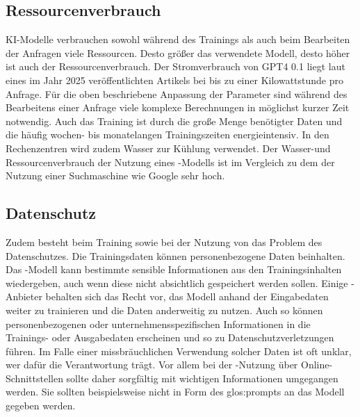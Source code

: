 \documentclass[../main.tex]{subfiles}
\begin{document}
\subsection{Ressourcenverbrauch}

KI-Modelle verbrauchen sowohl während des Trainings als auch beim Bearbeiten der Anfragen viele Ressourcen. Desto größer das verwendete Modell, desto höher ist auch der Ressourcenverbrauch. 
Der Stromverbrauch von GPT4 0.1 liegt laut eines im Jahr 2025 veröffentlichten Artikels bei bis zu einer Kilowattstunde pro Anfrage\cite{Energieverbrauch}. Für die oben beschriebene Anpassung der Parameter sind während des Bearbeitens einer Anfrage viele 
komplexe Berechnungen in möglichst kurzer Zeit notwendig. Auch das Training ist durch die große Menge benötigter Daten und die häufig wochen- bis monatelangen Trainingszeiten 
energieintensiv. In den Rechenzentren wird zudem Wasser zur Kühlung verwendet. Der Wasser-und Ressourcenverbrauch der Nutzung eines -Modells ist im Vergleich zu dem der Nutzung einer 
Suchmaschine wie Google sehr hoch\cite{KINachhaltigkeit}. 

\subsection{Datenschutz}
\label{sec:datenschutz}

Zudem besteht beim Training sowie bei der Nutzung von  das Problem des Datenschutzes. Die Trainingsdaten können personenbezogene Daten beinhalten. Das -Modell kann bestimmte sensible 
Informationen aus den Trainingsinhalten wiedergeben, auch wenn diese nicht absichtlich gespeichert werden sollen. Einige -Anbieter behalten sich das Recht vor, das Modell anhand der 
Eingabedaten weiter zu trainieren und die Daten anderweitig zu nutzen. Auch so können personenbezogenen oder unternehmensspezifischen Informationen in die Trainings- oder Ausgabedaten 
erscheinen und so zu Datenschutzverletzungen führen. Im Falle einer missbräuchlichen Verwendung solcher Daten ist oft unklar, wer dafür die Verantwortung trägt. Vor allem bei der -Nutzung 
über Online-Schnittstellen sollte daher sorgfältig mit wichtigen Informationen umgegangen werden. Sie sollten beispielsweise nicht in Form des \gls{glos:prompt}s an das Modell gegeben werden.
\end{document}
